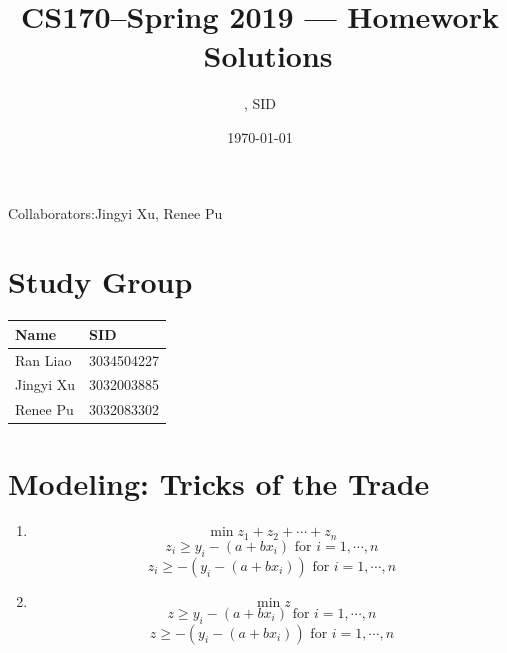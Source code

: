 \documentclass[11pt]{article}
\title{CS170--Spring 2019 --- Homework \Homework\ Solutions}
\author{\Name, SID \SID}
\date{\today}
\newenvironment{qparts}{\begin{enumerate}[{(}a{)}]}{\end{enumerate}}
\begin{document}
\maketitle
Collaborators:Jingyi Xu, Renee Pu

\section{Study Group}
	\begin{tabular}{ll}
		Name		&   SID         		\\\hline
		Ran Liao		&   3034504227  	\\  
		Jingyi Xu		&   3032003885  	\\
		Renee Pu		&   3032083302  	\\
	\end{tabular}

	



\newpage
\section{Modeling: Tricks of the Trade}
\begin{qparts}
	
	\item 
	
	\[
		\min z_1 + z_2 + \cdots + z_n
	\]
	\[
		z_i \ge y_i - (a + bx_i)  \text{ for } i = 1, \cdots, n
	\]
	\[
		z_i \ge -(y_i - (a + bx_i))  \text{ for } i = 1, \cdots, n
	\]
	
	\item 
	
	\[
		\min z
	\]
	\[
		z \ge y_i - (a + bx_i)  \text{ for } i = 1, \cdots, n
	\]
	\[
		z \ge -(y_i - (a + bx_i))  \text{ for } i = 1, \cdots, n
	\]
		
\end{qparts}



\newpage
\end{document}
